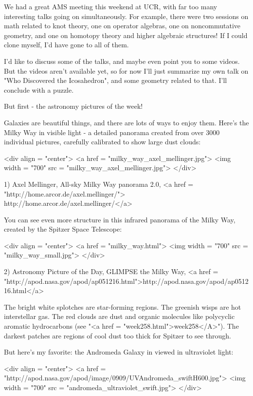 


We had a great AMS meeting this weekend at UCR, with far too many 
interesting talks going on simultaneously.  For example, there were 
two sessions on math related to knot theory, one on operator algebras, 
one on noncommutative geometry, and one on homotopy theory and higher 
algebraic structures!  If I could clone myself, I'd have gone to all of
them.  

I'd like to discuss some of the talks, and maybe even point you to
some videos.  But the videos aren't available yet, so for now I'll
just summarize my own talk on "Who Discovered the
Icosahedron", and some geometry related to that.  I'll conclude
with a puzzle.

But first - the astronomy pictures of the week!

Galaxies are beautiful things, and there are lots of ways to enjoy 
them.  Here's the Milky Way in visible light - a detailed panorama 
created from over 3000 individual pictures, carefully calibrated to 
show large dust clouds:

<div align = "center">
<a href = "milky_way_axel_mellinger.jpg">
<img width = "700" src = "milky_way_axel_mellinger.jpg">
</div>

1) Axel Mellinger, All-sky Milky Way panorama 2.0,
<a href = "http://home.arcor.de/axel.mellinger/">
http://home.arcor.de/axel.mellinger/</a>

You can see even more structure in this infrared panorama of the Milky 
Way, created by the Spitzer Space Telescope:

<div align = "center">
<a href = "milky_way.html">
<img width = "700" src = "milky_way_small.jpg">
</div>

2) Astronomy Picture of the Day, GLIMPSE the Milky Way,
<a href = "http://apod.nasa.gov/apod/ap051216.html">http://apod.nasa.gov/apod/ap051216.html</a>

The bright white splotches are star-forming regions.   The greenish 
wisps are hot interstellar gas.  The red clouds are dust and organic 
molecules like polycyclic aromatic hydrocarbons (see "<a href = "week258.html">week258</A>").  The 
darkest patches are regions of cool dust too thick for Spitzer to see 
through.

But here's my favorite: the Andromeda Galaxy in viewed in ultraviolet
light:

<div align = "center">
<a href = "http://apod.nasa.gov/apod/image/0909/UVAndromeda_swiftH600.jpg">
<img width = "700" src = "andromeda_ultraviolet_swift.jpg">
</div>

